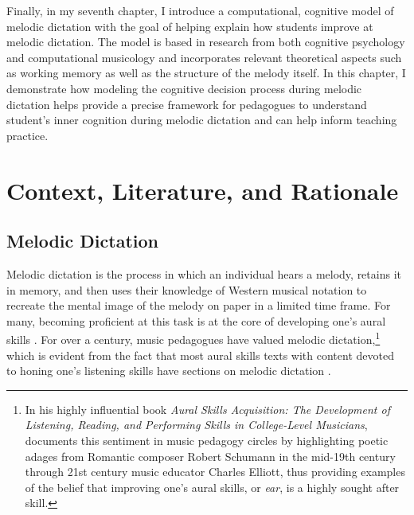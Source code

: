 \documentclass[12pt,]{book}
\let\rmarkdownfootnote\footnote%
\def\footnote{\protect\rmarkdownfootnote}
\begin{document}
Finally, in my seventh chapter, I introduce a computational, cognitive model of melodic dictation with the goal of helping explain how students improve at melodic dictation.
The model is based in research from both cognitive psychology \citep{cowanMagicalMysteryFour2010} and computational musicology \citep{pearceStatisticalLearningProbabilistic2018a} and incorporates relevant theoretical aspects such as working memory \citep{chenetteReframingAuralSkills2019, vanhandelRoleWorkingMemory2011} as well as the structure of the melody itself.
In this chapter, I demonstrate how modeling the cognitive decision process during melodic dictation helps provide a precise framework for pedagogues to understand student's inner cognition during melodic dictation and can help inform teaching practice.

\hypertarget{intro}{%
\chapter{Context, Literature, and Rationale}\label{intro}}

\hypertarget{melodic-dictation}{%
\section{Melodic Dictation}\label{melodic-dictation}}

Melodic dictation is the process in which an individual hears a melody, retains it in memory, and then uses their knowledge of Western musical notation to recreate the mental image of the melody on paper in a limited time frame.
For many, becoming proficient at this task is at the core of developing one's aural skills \citep{karpinskiModelMusicPerception1990}.
For over a century, music pedagogues have valued melodic dictation,\footnote{In his highly influential book \emph{Aural Skills Acquisition: The Development of Listening, Reading, and Performing Skills in College-Level Musicians}, \citet{karpinskiAuralSkillsAcquisition2000} documents this sentiment in music pedagogy circles by highlighting poetic adages from Romantic composer Robert Schumann in the mid-19th century through 21st century music educator Charles Elliott, thus providing examples of the belief that improving one's aural skills, or \emph{ear}, is a highly sought after skill.} which is evident from the fact that most aural skills texts with content devoted to honing one's listening skills have sections on melodic dictation \citep{karpinskiAuralSkillsAcquisition2000}.
\end{document}
